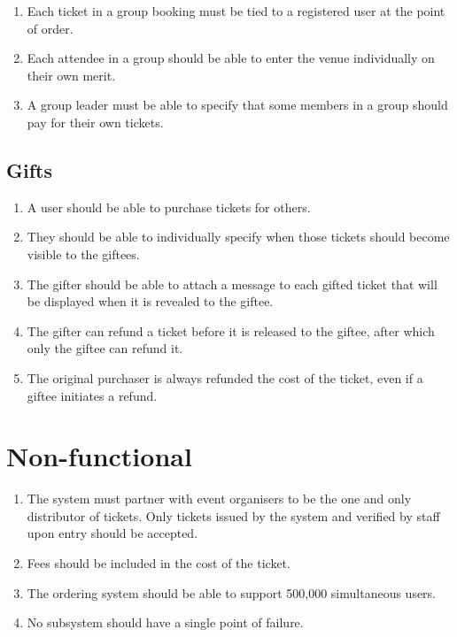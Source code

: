 \documentclass[12pt,a4]{bhamdissertation}
\begin{document}
\begin{enumerate}[resume]
    \item Each ticket in a group booking must be tied to a registered user at the point of order.
    \item Each attendee in a group should be able to enter the venue individually on their own merit.
    \item A group leader must be able to specify that some members in a group should pay for their own tickets.
\end{enumerate}

\subsection{Gifts}

\begin{enumerate}[resume]
    \item A user should be able to purchase tickets for others.
    \item They should be able to individually specify when those tickets should become visible to the giftees.
    \item The gifter should be able to attach a message to each gifted ticket that will be displayed when it is revealed to the giftee.
    \item The gifter can refund a ticket before it is released to the giftee, after which only the giftee can refund it.
    \item The original purchaser is always refunded the cost of the ticket, even if a giftee initiates a refund.
\end{enumerate}

\section{Non-functional}

\begin{enumerate}[resume]
    \item The system must partner with event organisers to be the one and only distributor of tickets. Only tickets issued by the system and verified by staff upon entry should be accepted.
    \item Fees should be included in the cost of the ticket.
    \item The ordering system should be able to support 500,000 simultaneous users.
    \item No subsystem should have a single point of failure.
\end{enumerate}
\end{document}
